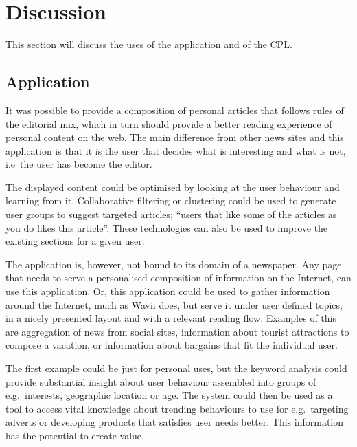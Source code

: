 \chapter{Discussion} %
\label{ch:discussion}
This section will discuss the uses of the application and of the CPL.

\section{Application}
It was possible to provide a composition of personal articles that follows rules of the editorial mix, which in turn should provide a better reading experience of personal content on the web. The main difference from other news sites and this application is that it is the user that decides what is interesting and what is not, i.e\ the user has become the editor.

The displayed content could be optimised by looking at the user behaviour and learning from it. Collaborative filtering or clustering could be used to generate user groups to suggest targeted articles; ``users that like some of the articles as you do likes this article''. These technologies can also be used to improve the existing sections for a given user.

The application is, however, not bound to its domain of a newspaper. Any page that needs to serve a personalised composition of information on the Internet, can use this application. Or, this application could be used to gather information around the Internet, much as Wavii does, but serve it under user defined topics, in a nicely presented layout and with a relevant reading flow. Examples of this are aggregation of news from social sites, information about tourist attractions to compose a vacation, or information about bargains that fit the individual user.

The first example could be just for personal uses, but the keyword analysis could provide substantial insight about user behaviour assembled into groups of e.g.\ interests, geographic location or age. The system could then be used as a tool to access vital knowledge about trending behaviours to use for e.g.\ targeting adverts or developing products that satisfies user needs better. This information has the potential to create value.

